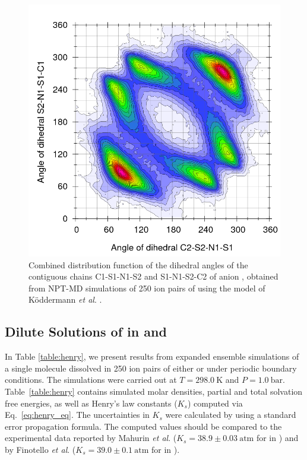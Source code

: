 \documentclass[3p,twocolumn]{elsarticle}
\begin{document}
\begin{figure}
\centering
\includegraphics[width=\linewidth]{Ludwig_anion}
\caption{Combined distribution function of the dihedral angles of the contiguous chains C1-S1-N1-S2 and S1-N1-S2-C2 of anion \ce{[NTf_2]^-}, obtained from NPT-MD simulations of 250 ion pairs of \ce{[emim][NTf_2]} using the model of K\"{o}ddermann \textit{et al}. \cite{Koddermann_2007}.}
\label{fig:die_ntf2}
\end{figure}

\subsection{Dilute Solutions of  in \ce{[emim][B(CN)_4]} and \ce{[emim][NTf_2]}}
\label{sec:henry_results}

In Table \ref{table:henry}, we present results from expanded ensemble simulations of a single  molecule dissolved in 250 ion pairs of either \ce{[emim][B(CN)_4]} or \ce{[emim][NTf_2]} under periodic boundary conditions.
The simulations were carried out at $T = 298.0~\mathrm{K}$ and $P = 1.0~\mathrm{bar}$.
Table~\ref{table:henry} contains simulated molar densities, partial and total solvation free energies, as well as Henry's law constants ($K_s$) computed via Eq.~\eqref{eq:henry_eq}.
The uncertainties in $K_s$ were calculated by using a standard error propagation formula.
The computed values should be compared to the experimental data reported by Mahurin \textit{et al}. \cite{Mahurin_2010} ($K_s = 38.9 \pm 0.03 ~\mathrm{atm}$ for  in \ce{[emim][B(CN)_4]}) and by Finotello \textit{et al}. \cite{Finotello_2008} ($K_s = 39.0 \pm 0.1 ~\mathrm{atm}$ for  in \ce{[emim][NTf_2]}).
\end{document}
